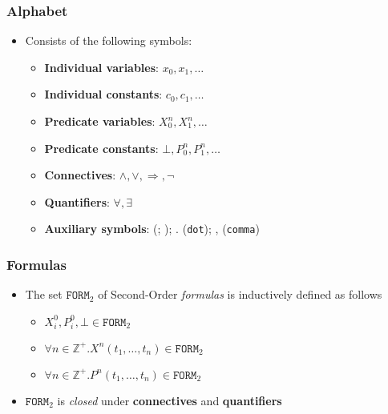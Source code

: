 \documentclass{beamer}
\begin{document}
                \begin{frame}
                    \frametitle{Alphabet}
                    \begin{itemize}
                        \item Consists of the following symbols:
                              \begin{itemize}
                                \item \textbf{Individual variables}: $ x_0, x_1, \dots $
                                \item \textbf{Individual constants}: $ c_0, c_1, \dots $
                                \item \textbf{Predicate variables}: $ X_0^n, X_1^n, \dots $
                                \item \textbf{Predicate constants}: $ \bot, P_0^n, P_1^n, \dots $
                                \item \textbf{Connectives}: $ \wedge, \vee, \Rightarrow, \neg $
                                \item \textbf{Quantifiers}: $ \forall, \exists $
                                \item \textbf{Auxiliary symbols}: (; ); . (\texttt{dot}); , (\texttt{comma})
                              \end{itemize}
                    \end{itemize}
                \end{frame}

                \begin{frame}
                    \frametitle{Formulas}
                    \begin{itemize}
                        \item The set $ \texttt{FORM}_2 $ of Second-Order \textit{formulas} is inductively defined as follows
                              \begin{itemize}
                                \item $ X^0_i, P^0_i, \bot \in \texttt{FORM}_2 $
                                \item $ \forall n \in \mathbb{Z}^+. X^n(t_1, \dots, t_n) \in \texttt{FORM}_2 $
                                \item $ \forall n \in \mathbb{Z}^+. P^n(t_1, \dots, t_n) \in \texttt{FORM}_2 $
                              \end{itemize}
                        \item $ \texttt{FORM}_2 $ is \textit{closed} under \textbf{connectives} and \textbf{quantifiers}
                    \end{itemize}
                \end{frame}
\end{document}
